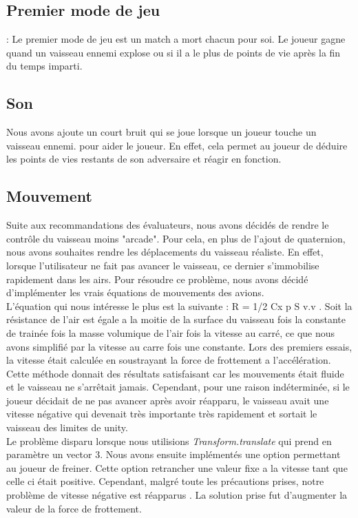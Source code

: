 \documentclass[10pt, titlepage]{report}
\begin{document}
\subsection{Premier mode de jeu} : Le premier mode de jeu est un match a mort chacun pour soi. Le joueur gagne quand un vaisseau ennemi explose ou si il a le plus de points de vie après la fin du temps imparti.\\
 
\subsection{Son} 
 Nous avons ajoute un court bruit qui se joue lorsque un joueur touche un vaisseau ennemi. pour aider le joueur. En effet, cela permet au joueur de déduire les points de vies restants de son adversaire et réagir en fonction.\\

\subsection{Mouvement}
Suite aux recommandations des évaluateurs, nous avons décidés de rendre le contrôle du vaisseau moins "arcade". Pour cela, en plus de l'ajout de quaternion, nous avons souhaites rendre les déplacements du vaisseau réaliste. En effet, lorsque l'utilisateur ne fait pas avancer le vaisseau, ce dernier s'immobilise rapidement dans les airs. Pour résoudre ce problème, nous avons décidé d'implémenter les vrais équations de mouvements des avions.\\

 L'équation qui nous intéresse le plus est la suivante : R = 1/2 Cx  p S v.v . Soit la résistance de l'air est égale a la moitie de la surface du vaisseau fois la constante de trainée fois la masse volumique de l'air fois la vitesse au carré, ce que nous avons simplifié par la vitesse au carre fois une constante. Lors des premiers essais, la vitesse était calculée en soustrayant la force de frottement a l'accélération. Cette méthode donnait des résultats satisfaisant car les mouvements était fluide et le vaisseau ne s'arrêtait jamais. Cependant, pour une raison indéterminée, si le joueur décidait de ne pas avancer après avoir réapparu, le vaisseau avait une vitesse négative qui devenait très importante très rapidement et sortait le vaisseau des limites de unity.\\

Le problème disparu lorsque nous utilisions \textit{Transform.translate} qui prend en paramètre un vector 3. Nous avons ensuite implémentés une option permettant au joueur de freiner. Cette option retrancher une valeur fixe a la vitesse tant que celle ci était positive. Cependant, malgré toute les précautions prises, notre problème de vitesse négative est réapparus . La solution prise fut d'augmenter la valeur de la force de frottement.\\
\end{document}
